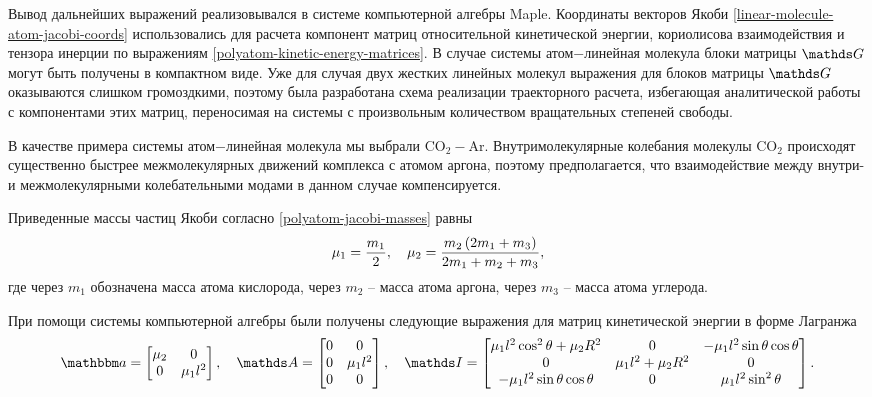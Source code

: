 Вывод дальнейших выражений реализовывался в системе компьютерной алгебры Maple. Координаты векторов Якоби \eqref{linear-molecule-atom-jacobi-coords} использовались для расчета компонент матриц относительной кинетической энергии, кориолисова взаимодействия и тензора инерции по выражениям \eqref{polyatom-kinetic-energy-matrices}. В случае системы атом$-$линейная молекула блоки матрицы $\bbG$ могут быть получены в компактном виде. Уже для случая двух жестких линейных молекул выражения для блоков матрицы $\bbG$ оказываются слишком громоздкими, поэтому была разработана схема реализации траекторного расчета, избегающая аналитической работы с компонентами этих матриц, переносимая на системы с произвольным количеством вращательных степеней свободы. \par
В качестве примера системы атом$-$линейная молекула мы выбрали CO$_2-$Ar. Внутримолекулярные колебания молекулы CO$_2$ происходят существенно быстрее межмолекулярных движений комплекса с атомом аргона, поэтому предполагается, что взаимодействие между внутри- и межмолекулярными колебательными модами в данном случае компенсируется. \par
Приведенные массы частиц Якоби согласно \eqref{polyatom-jacobi-masses} равны
\begin{gather}
    \mu_1 = \frac{m_1}{2}, \quad \mu_2 = \frac{m_2 \left( 2 m_1 + m_3 \right)}{2 m_1 + m_2 + m_3},
\end{gather}
% 
где через $m_1$ обозначена масса атома кислорода, через $m_2$ -- масса атома аргона, через $m_3$ -- масса атома углерода. \par
При помощи системы компьютерной алгебры были получены следующие выражения для матриц кинетической энергии в форме Лагранжа
\begin{gather}
	\bba =
	\begin{bmatrix}
		\mu_2 & 0 \\
		0 & \mu_1 l^2
	\end{bmatrix}, \quad 
	\bbA = 
	\begin{bmatrix}
		0 & 0 \\
		0 & \mu_1 l^2 \\
		0 & 0 
	\end{bmatrix}, \quad
	\bbI = 
	\begin{bmatrix}
		\mu_1 l^2 \cos^2 \theta + \mu_2 R^2 & 0 & -\mu_1 l^2 \sin \theta \cos \theta \\
		0 & \mu_1 l^2 + \mu_2 R^2 & 0 \\
		- \mu_1 l^2 \sin \theta \cos \theta & 0 & \mu_1 l^2 \sin^2 \theta
	\end{bmatrix}. \notag
\end{gather}

